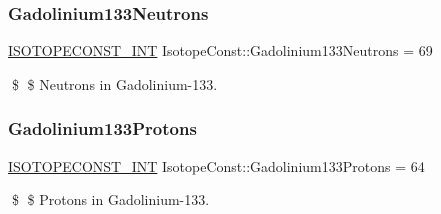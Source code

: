 \subsubsection{\texorpdfstring{Gadolinium133\+Neutrons}{Gadolinium133Neutrons}}
{\footnotesize\ttfamily \mbox{\hyperlink{group___isotope_const-_macros_ga5f18360b3e99483a35c32d789e62621c}{I\+S\+O\+T\+O\+P\+E\+C\+O\+N\+S\+T\+\_\+\+I\+NT}} Isotope\+Const\+::\+Gadolinium133\+Neutrons = 69}

\$ \$ Neutrons in Gadolinium-\/133. \mbox{\label{group___isotope_const-_gadolinium-_gd133_ga938de94e859276452eab45a72c0fab1b}} 
\subsubsection{\texorpdfstring{Gadolinium133\+Protons}{Gadolinium133Protons}}
{\footnotesize\ttfamily \mbox{\hyperlink{group___isotope_const-_macros_ga5f18360b3e99483a35c32d789e62621c}{I\+S\+O\+T\+O\+P\+E\+C\+O\+N\+S\+T\+\_\+\+I\+NT}} Isotope\+Const\+::\+Gadolinium133\+Protons = 64}

\$ \$ Protons in Gadolinium-\/133. 